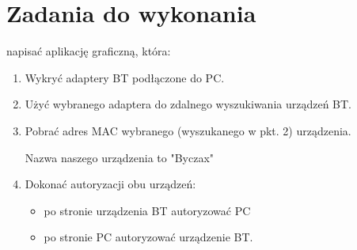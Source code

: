 \documentclass[a4paper,12pt]{extarticle}  %
\begin{document}
\section{Zadania do wykonania}
napisać aplikację graficzną, która:
\begin{enumerate}
	\item Wykryć adaptery BT podłączone do PC.
	\item Użyć wybranego adaptera do zdalnego wyszukiwania urządzeń BT.
	\item Pobrać adres MAC wybranego (wyszukanego w pkt. 2) urządzenia.
	\begin{figure}[H]
	   \centering
	\end{figure}
	Nazwa naszego urządzenia to "Byczax"
	\item Dokonać autoryzacji obu urządzeń:
	      \begin{itemize}
		      \item po stronie urządzenia BT autoryzować PC
			  \begin{figure}[H]
				 \centering
			  \end{figure}
		      \item po stronie PC autoryzować urządzenie BT.
			  \begin{figure}[H]

\end{figure}
\end{itemize}
\end{enumerate}
\end{document}
